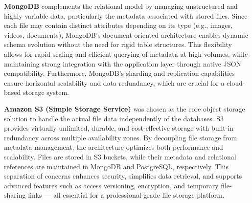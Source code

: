 \textbf{MongoDB} complements the relational model by managing unstructured and highly variable data, particularly the metadata associated with stored files. Since each file may contain distinct attributes depending on its type (e.g., images, videos, documents), MongoDB’s document-oriented architecture enables dynamic schema evolution without the need for rigid table structures. This flexibility allows for rapid scaling and efficient querying of metadata at high volumes, while maintaining strong integration with the application layer through native JSON compatibility. Furthermore, MongoDB’s sharding and replication capabilities ensure horizontal scalability and data redundancy, which are crucial for a cloud-based storage system.

\textbf{Amazon S3 (Simple Storage Service)} was chosen as the core object storage solution to handle the actual file data independently of the databases. S3 provides virtually unlimited, durable, and cost-effective storage with built-in redundancy across multiple availability zones. By decoupling file storage from metadata management, the architecture optimizes both performance and scalability. Files are stored in S3 buckets, while their metadata and relational references are maintained in MongoDB and PostgreSQL, respectively. This separation of concerns enhances security, simplifies data retrieval, and supports advanced features such as access versioning, encryption, and temporary file-sharing links — all essential for a professional-grade file storage platform.

